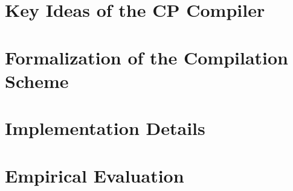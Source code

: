 \chapter{Key Ideas of the CP Compiler}

\chapter{Formalization of the Compilation Scheme}

\chapter{Implementation Details}

\chapter{Empirical Evaluation}
